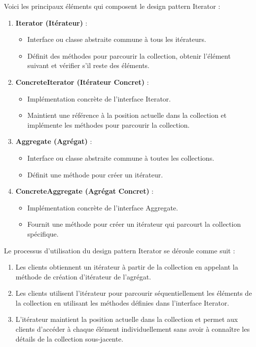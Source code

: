 Voici les principaux éléments qui composent le design pattern Iterator :

\begin{enumerate}[leftmargin=*,labelsep=3mm]
    \item \textbf{Iterator (Itérateur)} :
    \begin{itemize}
        \item Interface ou classe abstraite commune à tous les itérateurs.
        \item Définit des méthodes pour parcourir la collection, obtenir l'élément suivant et vérifier s'il reste des éléments.
    \end{itemize}
    
    \item \textbf{ConcreteIterator (Itérateur Concret)} :
    \begin{itemize}
        \item Implémentation concrète de l'interface Iterator.
        \item Maintient une référence à la position actuelle dans la collection et implémente les méthodes pour parcourir la collection.
    \end{itemize}
    
    \item \textbf{Aggregate (Agrégat)} :
    \begin{itemize}
        \item Interface ou classe abstraite commune à toutes les collections.
        \item Définit une méthode pour créer un itérateur.
    \end{itemize}
    
    \item \textbf{ConcreteAggregate (Agrégat Concret)} :
    \begin{itemize}
        \item Implémentation concrète de l'interface Aggregate.
        \item Fournit une méthode pour créer un itérateur qui parcourt la collection spécifique.
    \end{itemize}
\end{enumerate}

Le processus d'utilisation du design pattern Iterator se déroule comme suit :

\begin{enumerate}[leftmargin=*,labelsep=3mm]
    \item Les clients obtiennent un itérateur à partir de la collection en appelant la méthode de création d'itérateur de l'agrégat.
    \item Les clients utilisent l'itérateur pour parcourir séquentiellement les éléments de la collection en utilisant les méthodes définies dans l'interface Iterator.
    \item L'itérateur maintient la position actuelle dans la collection et permet aux clients d'accéder à chaque élément individuellement sans avoir à connaître les détails de la collection sous-jacente.
\end{enumerate}


